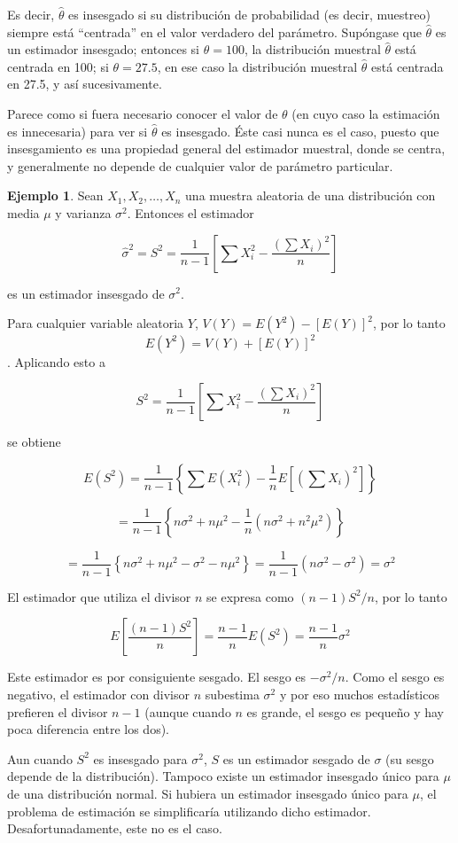 \documentclass[
  11pt,
]{book}
\theoremstyle{definition}
\theoremstyle{definition}
\newtheorem{example}{Ejemplo}[chapter]
\theoremstyle{definition}
\theoremstyle{definition}
\theoremstyle{remark}
\begin{document}
Es decir, \(\hat{\theta}\) es insesgado si su distribución de probabilidad (es decir, muestreo) siempre está ``centrada'' en el valor verdadero del parámetro. Supóngase que \(\hat{\theta}\) es un estimador insesgado; entonces si \(\theta = 100\), la distribución muestral \(\hat{\theta}\) está centrada en 100; si \(\theta = 27.5\), en ese caso la distribución muestral \(\hat{\theta}\) está centrada en 27.5, y así sucesivamente.

Parece como si fuera necesario conocer el valor de \(\theta\) (en cuyo caso la estimación es innecesaria) para ver si \(\hat{\theta}\) es insesgado. Éste casi nunca es el caso, puesto que insesgamiento es una propiedad general del estimador muestral, donde se centra, y generalmente no depende de cualquier valor de parámetro particular.

\begin{example}
Sean \(X_1, X_2, \ldots, X_n\) una muestra aleatoria de una distribución con media \(\mu\) y varianza \(\sigma^2\). Entonces el estimador

\[
\widehat\sigma^2 = S^2 = \frac{1}{n-1} \left[ \sum X_i^2 - \frac{(\sum X_i)^2}{n} \right]
\]

es un estimador insesgado de \(\sigma^2\).

Para cualquier variable aleatoria \(Y\), \(V(Y) = E(Y^2) - [E(Y)]^2\), por lo tanto\\
\[ E(Y^2) = V(Y) + [E(Y)]^2 \]. Aplicando esto a

\[
S^2 = \frac{1}{n-1} \left[ \sum X_i^2 - \frac{(\sum X_i)^2}{n} \right]
\]

se obtiene

\[
E(S^2) = \frac{1}{n-1} \left\{ \sum E(X_i^2) - \frac{1}{n} E\left[(\sum X_i)^2\right] \right\}
\]

\[
= \frac{1}{n-1} \left\{ n\sigma^2 + n\mu^2 - \frac{1}{n} (n\sigma^2 + n^2\mu^2) \right\}
\]

\[
= \frac{1}{n-1} \left\{ n\sigma^2 + n\mu^2 - \sigma^2 - n\mu^2 \right\} = \frac{1}{n-1} (n\sigma^2 - \sigma^2) = \sigma^2
\]

El estimador que utiliza el divisor \(n\) se expresa como \((n-1)S^2/n\), por lo tanto

\[
E\left[\frac{(n-1)S^2}{n}\right] = \frac{n-1}{n} E(S^2) = \frac{n-1}{n} \sigma^2
\]

Este estimador es por consiguiente sesgado. El sesgo es \(- \sigma^2 / n\). Como el sesgo es negativo, el estimador con divisor \(n\) subestima \(\sigma^2\) y por eso muchos estadísticos prefieren el divisor \(n-1\) (aunque cuando \(n\) es grande, el sesgo es pequeño y hay poca diferencia entre los dos).

Aun cuando \(S^2\) es insesgado para \(\sigma^2\), \(S\) es un estimador sesgado de \(\sigma\) (su sesgo depende de la distribución). Tampoco existe un estimador insesgado único para \(\mu\) de una distribución normal. Si hubiera un estimador insesgado único para \(\mu\), el problema de estimación se simplificaría utilizando dicho estimador. Desafortunadamente, este no es el caso.
\end{example}
\end{document}
